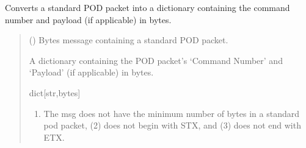 \documentclass[letterpaper,10pt,english]{sphinxmanual}
\begin{document}
\begin{fulllineitems}
\begin{fulllineitems}
\begin{quote}
\begin{description}
\begin{enumerate}
\end{enumerate}


\end{description}\end{quote}

\end{fulllineitems}


\begin{fulllineitems}
\label{\detokenize{BasicPodProtocol:BasicPodProtocol.POD_Basics.UnpackPODpacket_Standard}}
\pysigstartsignatures
{}
\pysigstopsignatures
\sphinxAtStartPar
Converts a standard POD packet into a dictionary containing the command number and payload
(if applicable) in bytes.
\begin{quote}\begin{description}
\sphinxAtStartPar
{} () \textendash{} Bytes message containing a standard POD packet.

\sphinxAtStartPar
A dictionary containing the POD packet’s ‘Command Number’ and ‘Payload’                 (if applicable) in bytes.

\sphinxAtStartPar
dict{[}str,bytes{]}

\sphinxAtStartPar
{} \textendash{} \begin{enumerate}
%
\item {} 
\sphinxAtStartPar
The msg does not have the minimum number of bytes in a standard pod packet,                 (2) does not begin with STX, and (3) does not end with ETX.

\end{enumerate}


\end{description}\end{quote}


\end{fulllineitems}
\end{fulllineitems}
\end{document}
